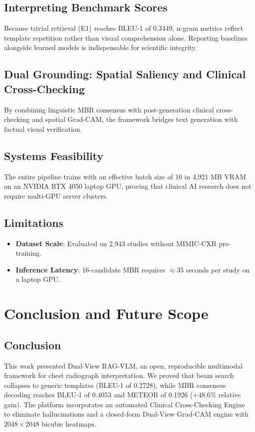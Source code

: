 \documentclass[12pt,a4paper]{report}
\begin{document}
\section{Interpreting Benchmark Scores}
Because trivial retrieval (E1) reaches BLEU-1 of 0.3449, n-gram metrics reflect template repetition rather than visual comprehension alone. Reporting baselines alongside learned models is indispensable for scientific integrity.

\section{Dual Grounding: Spatial Saliency and Clinical Cross-Checking}
By combining linguistic MBR consensus with post-generation clinical cross-checking and spatial Grad-CAM, the framework bridges text generation with factual visual verification.

\section{Systems Feasibility}
The entire pipeline trains with an effective batch size of 16 in 4,921 MB VRAM on an NVIDIA RTX 4050 laptop GPU, proving that clinical AI research does not require multi-GPU server clusters.

\section{Limitations}
\begin{itemize}
    \item \textbf{Dataset Scale}: Evaluated on 2,943 studies without MIMIC-CXR pre-training.
    \item \textbf{Inference Latency}: 16-candidate MBR requires $\approx 35$ seconds per study on a laptop GPU.
\end{itemize}

\chapter{Conclusion and Future Scope}

\section{Conclusion}
This work presented Dual-View RAG-VLM, an open, reproducible multimodal framework for chest radiograph interpretation. We proved that beam search collapses to generic templates (BLEU-1 of 0.2728), while MBR consensus decoding reaches BLEU-1 of 0.4053 and METEOR of 0.1926 (+48.6\% relative gain). The platform incorporates an automated Clinical Cross-Checking Engine to eliminate hallucinations and a closed-form Dual-View Grad-CAM engine with $2048 \times 2048$ bicubic heatmaps.
\end{document}
